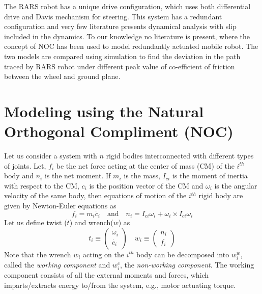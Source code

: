  The RARS robot has a unique  drive configuration, which uses both differential drive and Davis mechanism for steering. 
 This system has a redundant configuration and very few literature presents dynamical analysis with slip included in the dynamics. To our knowledge no literature is present, where the concept of  NOC  has been used to model redundantly actuated mobile robot. The two models are compared using simulation to find the deviation in the path traced by RARS robot under different peak value of co-efficient of friction between the wheel and ground plane.
   


   
 
 

  
  
  
  
  
\section{Modeling using the Natural Orthogonal Compliment (NOC)}
Let us consider a system with $n$ rigid bodies interconnected with different types of joints. 
Let, $f_i$ be the net force acting at the center of mass (CM) of the $i^{th}$  body and $n_i$ is the net moment.
 If $m_i$ is the mass, $I_{ci}$ is the  moment of inertia with respect to the CM, $c_i$ is the position vector of the CM and $\omega_i$ is the angular velocity of the same body, then equations of motion of the $i^{th}$ rigid body are given by Newton-Euler equations as 
\begin{equation}
\label{NE}
f_i=m_i\ddot{c_i} \quad \text{and} \quad n_i=I_{ci} \omega_i+\omega_i \times I_{ci} \omega_i
\end{equation}
Let us  define twist ($t$) and wrench($w$) as 
\begin{equation*}
t_i \equiv \begin{pmatrix}
\omega_i\\ \dot{c_i}
\end{pmatrix} \quad
w_i \equiv \begin{pmatrix}
n_i\\f_i
\end{pmatrix}
\end{equation*}
Note that the wrench $w_i$ acting on the $i^{th}$ body can be decomposed into $w^w_i$, called the \textit{working component} and  $w^c_i$, the \textit{non-working component}.
 The working component consists of all the external  moments and forces, which imparts/extracts energy to/from the system, e.g., motor actuating torque.
